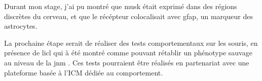 Durant mon stage, j'ai pu montré que \gls{musk} était exprimé dans des régions discrètes du cerveau, et que le récépteur colocalisait avec \gls{gfap}, un marqueur des astrocytes.

La prochaine étape serait de réaliser des tests comportementaux sur les souris, en présence de \gls{licl} qui à été montré comme pouvant rétablir un phénotype sauvage au niveau de la \gls{jnm} \cite{Messeant2017}. Ces tests pourraient être réalisés en partenariat avec une plateforme basée à l'ICM dédiée au comportement.